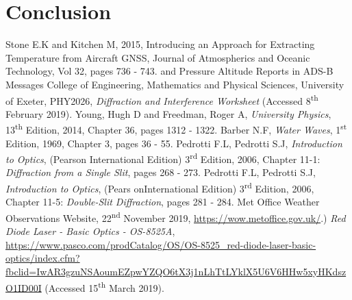 \documentclass{article}
\begin{document}
\section{Conclusion}
\label{sec:conclusion}




\begin{thebibliography}{9}
 Stone E.K and Kitchen M, 2015, Introducing an Approach for Extracting Temperature from Aircraft GNSS, Journal of Atmospherics and Oceanic Technology, Vol 32, pages 736 - 743. 
and Pressure Altitude Reports in ADS-B Messages
 College of Engineering, Mathematics and Physical Sciences, University of Exeter, PHY2026, \textit{Diffraction and Interference Worksheet} (Accessed 8\textsuperscript{th} February 2019).
 Young, Hugh D and Freedman, Roger A, \textit{University Physics}, 13\textsuperscript{th} Edition, 2014, Chapter 36, pages 1312 - 1322.
 Barber N.F, \textit{Water Waves}, 1\textsuperscript{st} Edition, 1969, Chapter 3, pages 36 - 55. 
 Pedrotti F.L, Pedrotti S.J, \textit{Introduction to Optics}, (Pearson International Edition) 3\textsuperscript{rd} Edition, 2006, Chapter 11-1: \textit{Diffraction from a Single Slit}, pages 268 - 273.
 Pedrotti F.L, Pedrotti S.J, \textit{Introduction to Optics},  (Pears onInternational Edition) 3\textsuperscript{rd} Edition, 2006, Chapter 11-5: \textit{Double-Slit Diffraction}, pages 281 - 284.
 Met Office Weather Observations Website, 22\textsuperscript{nd} November 2019,  \url{https://wow.metoffice.gov.uk/}.)
 \textit{Red Diode Laser - Basic Optics - OS-8525A}, 
\url{https://www.pasco.com/prodCatalog/OS/OS-8525_red-diode-laser-basic-optics/index.cfm?fbclid=IwAR3gzuNSAoumEZpwYZQO6tX3j1nLhTtLYklX5U6V6HHw5xyHKdszO1ID00I} (Accessed 15\textsuperscript{th} March 2019).

\end{thebibliography}
\end{document}
